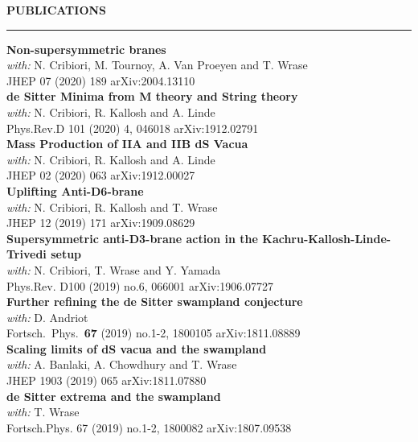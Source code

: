 \documentclass[a4paper,12pt,twoside,openright]{report}
\newenvironment{rSection}[1]{ %
  \sectionskip
  \MakeUppercase{\bf #1} %
  \sectionlineskip
  \hrule %
  \begin{list}{}{ %
    \setlength{\leftmargin}{1.5em} %
  }
  \item[]
}{
  \end{list}
}
\def\sectionlineskip{\medskip} %
\def\sectionskip{\medskip} %
\begin{document}
            \newpage
            \begin{rSection}{Publications}
               \vspace{7pt}
            {\bf Non-supersymmetric branes}
            \\\emph{with:} N. Cribiori, M. Tournoy, A. Van Proeyen and T. Wrase
             \\ JHEP 07 (2020) 189 \hfill arXiv:2004.13110\vspace{7pt}
            \\{\bf de Sitter Minima from M theory and String theory}
            \\\emph{with:} N. Cribiori, R. Kallosh and A. Linde
             \\ Phys.Rev.D 101 (2020) 4, 046018 \hfill arXiv:1912.02791\vspace{7pt}
            \\{\bf Mass Production of IIA and IIB dS Vacua}
            \\\emph{with:} N. Cribiori, R. Kallosh and A. Linde
             \\ JHEP 02 (2020) 063 \hfill arXiv:1912.00027\vspace{7pt}
            \\{\bf Uplifting Anti-D6-brane}
            \\\emph{with:} N. Cribiori, R. Kallosh and T. Wrase
             \\ JHEP 12 (2019) 171 \hfill arXiv:1909.08629\vspace{7pt}
             \\{\bf Supersymmetric anti-D3-brane action in the Kachru-Kallosh-Linde-Trivedi setup}
            \\\emph{with:} N. Cribiori, T. Wrase and Y. Yamada
            \\Phys.Rev. D100 (2019) no.6, 066001 \hfill arXiv:1906.07727\vspace{7pt}
            \\{\bf Further refining the de Sitter swampland conjecture}
            \\\emph{with:} D. Andriot 
            \\Fortsch.\ Phys.\  {\bf 67} (2019) no.1-2,  1800105 \hfill arXiv:1811.08889\vspace{7pt}
            \\{\bf Scaling limits of dS vacua and the swampland}
            \\\emph{with:} A. Banlaki, A. Chowdhury and T. Wrase
            \\JHEP 1903 (2019) 065 \hfill arXiv:1811.07880\vspace{7pt}
            \\{\bf de Sitter extrema and the swampland}
            \\\emph{with:} T. Wrase
            \\Fortsch.Phys. 67 (2019) no.1-2, 1800082 \hfill arXiv:1807.09538
            
            \end{rSection}
            
\end{document}
